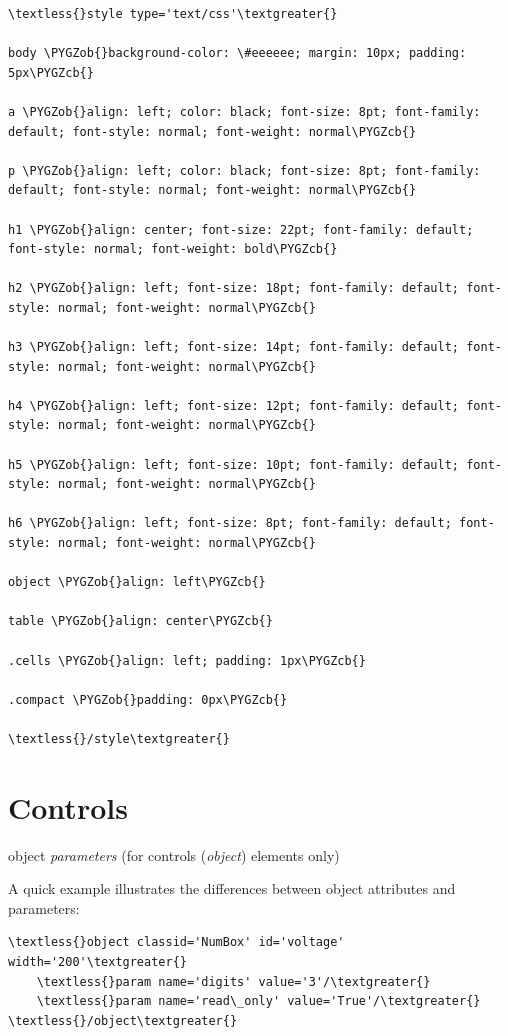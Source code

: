 \documentclass[letterpaper,10pt,english]{sphinxmanual}
\def\PYGZob{\char`\{}
\def\PYGZcb{\char`\}}
\begin{document}
\begin{Verbatim}[commandchars=\\\{\}]
\textless{}style type='text/css'\textgreater{}

body \PYGZob{}background-color: \#eeeeee; margin: 10px; padding: 5px\PYGZcb{}

a \PYGZob{}align: left; color: black; font-size: 8pt; font-family: default; font-style: normal; font-weight: normal\PYGZcb{}

p \PYGZob{}align: left; color: black; font-size: 8pt; font-family: default; font-style: normal; font-weight: normal\PYGZcb{}

h1 \PYGZob{}align: center; font-size: 22pt; font-family: default; font-style: normal; font-weight: bold\PYGZcb{}

h2 \PYGZob{}align: left; font-size: 18pt; font-family: default; font-style: normal; font-weight: normal\PYGZcb{}

h3 \PYGZob{}align: left; font-size: 14pt; font-family: default; font-style: normal; font-weight: normal\PYGZcb{}

h4 \PYGZob{}align: left; font-size: 12pt; font-family: default; font-style: normal; font-weight: normal\PYGZcb{}

h5 \PYGZob{}align: left; font-size: 10pt; font-family: default; font-style: normal; font-weight: normal\PYGZcb{}

h6 \PYGZob{}align: left; font-size: 8pt; font-family: default; font-style: normal; font-weight: normal\PYGZcb{}

object \PYGZob{}align: left\PYGZcb{}

table \PYGZob{}align: center\PYGZcb{}

.cells \PYGZob{}align: left; padding: 1px\PYGZcb{}

.compact \PYGZob{}padding: 0px\PYGZcb{}

\textless{}/style\textgreater{}
\end{Verbatim}


\section{Controls}
\label{programming:controls}
object \emph{parameters} (for controls (\emph{object}) elements only)

A quick example illustrates the differences between object attributes and
parameters:

\begin{Verbatim}[commandchars=\\\{\}]
\textless{}object classid='NumBox' id='voltage' width='200'\textgreater{}
    \textless{}param name='digits' value='3'/\textgreater{}
    \textless{}param name='read\_only' value='True'/\textgreater{}
\textless{}/object\textgreater{}
\end{Verbatim}
\end{document}
